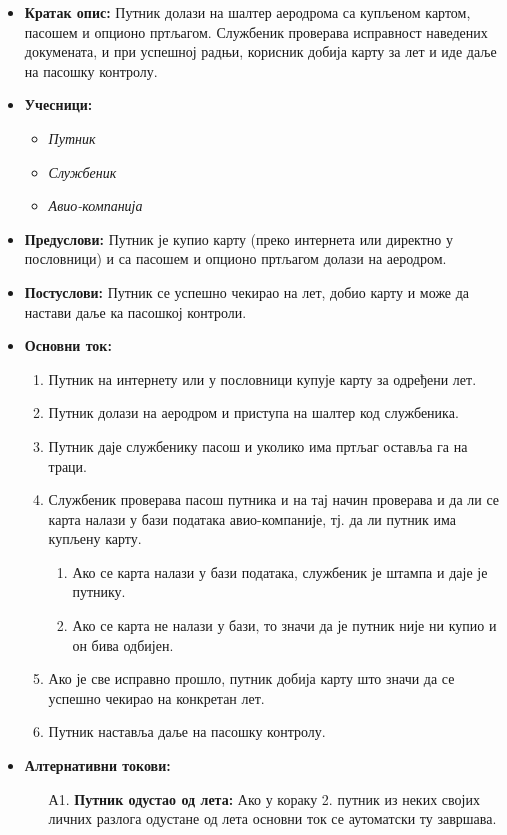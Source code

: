 \documentclass{article}
\begin{document}
\begin{itemize}
    \item \textbf{Кратак опис:} Путник долази на шалтер аеродрома са купљеном картом, пасошем и опционо пртљагом. Службеник проверава исправност наведених докумената, и при успешној радњи, корисник добија карту за лет и иде даље на пасошку контролу.
    \item \textbf{Учесници:}
        \begin{itemize}
            \item \textit{Путник}
            \item \textit{Службеник}
            \item \textit{Авио-компанија}
        \end{itemize}
    \item \textbf{Предуслови:} Путник је купио карту (преко интернета или директно у пословници) и са пасошем и опционо пртљагом долази на аеродром.
    \item \textbf{Постуслови:} Путник се успешно чекирао на лет, добио карту и може да настави даље ка пасошкој контроли.
    \item \textbf{Основни ток:}
        \begin{enumerate}
            \item Путник на интернету или у пословници купује карту за одређени лет.
            \item Путник долази на аеродром и приступа на шалтер код службеника.
            \item Путник даје службенику пасош и уколико има пртљаг оставља га на траци.
            \item Службеник проверава пасош путника и на тај начин проверава и да ли се карта налази у бази података авио-компаније, тј. да ли путник има купљену карту.
                \begin{enumerate}
                    \item Ако се карта налази у бази података, службеник је штампа и даје је путнику.
                    \item Ако се карта не налази у бази, то значи да је путник није ни купио и он бива одбијен. 
                \end{enumerate}
            \item Ако је све исправно прошло, путник добија карту што значи да се успешно чекирао на конкретан лет.
            \item Путник наставља даље на пасошку контролу.
        \end{enumerate}
    
    \item \textbf{Алтернативни токови:}
    \begin{itemize}
        \item[А1.] \textbf{Путник одустао од лета:} Ако у кораку 2. путник из неких својих личних разлога одустане од лета основни ток се аутоматски ту завршава.
    \end{itemize}
   
\end{itemize}
\end{document}
